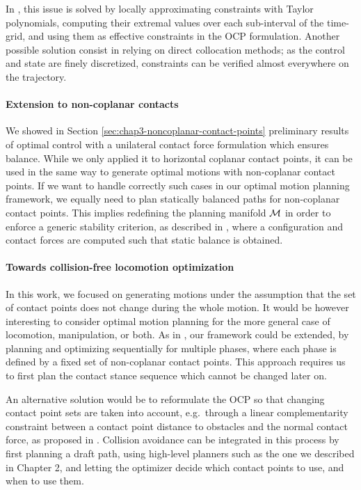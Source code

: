 In \cite{lengagne2013generation}, this issue is solved by locally
approximating constraints with Taylor polynomials, computing their
extremal values over each sub-interval of the time-grid, and using
them as effective constraints in the OCP formulation. Another possible
solution consist in relying on direct collocation methods; as the
control and state are finely discretized, constraints can be verified
almost everywhere on the trajectory.

\paragraph{Extension to non-coplanar contacts}
We showed in Section \ref{sec:chap3-noncoplanar-contact-points}
preliminary results of optimal control with a unilateral contact force
formulation which ensures balance. While we only applied it to
horizontal coplanar contact points, it can be used in the same way to
generate optimal motions with non-coplanar contact points. If we want
to handle correctly such cases in our optimal motion planning
framework, we equally need to plan statically balanced paths for
non-coplanar contact points. This implies redefining the planning
manifold $\mathcal{M}$ in order to enforce a generic stability criterion,
as described in \cite{bretl2006motion}, where a configuration and
contact forces are computed such that static balance is obtained.

\paragraph{Towards collision-free locomotion optimization}
In this work, we focused on generating motions under the assumption
that the set of contact points does not change during the whole
motion. It would be however interesting to consider optimal motion
planning for the more general case of locomotion, manipulation, or
both. As in \cite{lengagne2013generation}, our framework could be
extended, by planning and optimizing sequentially for multiple phases,
where each phase is defined by a fixed set of non-coplanar contact
points. This approach requires us to first plan the contact stance
sequence which cannot be changed later on.

An alternative solution would be to reformulate the OCP so that
changing contact point sets are taken into account, e.g.\ through a
linear complementarity constraint between a contact point distance to
obstacles and the normal contact force, as proposed in
\cite{posa2012direct, tassa2012synthesis,
  mordatch2012discovery}. Collision avoidance can be integrated in
this process by first planning a draft path, using high-level planners
such as the one we described in Chapter 2, and letting the optimizer
decide which contact points to use, and when to use them.

